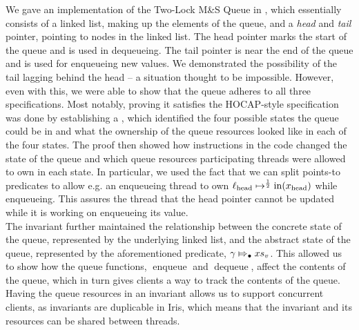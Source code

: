 \documentclass[a4paper, 10pt]{report}
\theoremstyle{definition}
\newcommand{\enqueue}{\operatorname{enqueue}}
\newcommand{\dequeue}{\operatorname{dequeue}}
\newcommand{\msq}{M\&S Queue}
\newcommand{\tlmsq}{Two-Lock \msq{}}
\newcommand{\locN}[1]{\loc_{\mathrm{#1}}}
\newcommand{\lochead}{\locN{head}}
\newcommand{\nIn}[1]{\operatorname{in}(#1)}
\newcommand{\node}{x}
\newcommand{\nodeN}[1]{\node_{\mathrm{#1}}}
\newcommand{\nodehead}{\nodeN{head}}
\newcommand{\absvalueList}{xs_v}
\newcommand{\abstractstateauth}[2]{#1 \Mapsto_{\bullet} #2}
\begin{document}
We gave an implementation of the \tlmsq{} in \heaplang{}, which essentially consists of a linked list, making up the elements of the queue, and a \textit{head} and \textit{tail} pointer, pointing to nodes in the linked list. The head pointer marks the start of the queue and is used in dequeueing. The tail pointer is near the end of the queue and is used for enqueueing new values. We demonstrated the possibility of the tail lagging behind the head -- a situation thought to be impossible. However, even with this, we were able to show that the queue adheres to all three specifications. Most notably, proving it satisfies the HOCAP-style specification was done by establishing a , which identified the four possible states the queue could be in and what the ownership of the queue resources looked like in each of the four states. The proof then showed how instructions in the code changed the state of the queue and which queue resources participating threads were allowed to own in each state. In particular, we used the fact that we can split points-to predicates to allow e.g. an enqueueing thread to own $\lochead \mapsto^{\frac{1}{2}} \nIn{\nodehead}$ while enqueueing. This assures the thread that the head pointer cannot be updated while it is working on enqueueing its value.\\
The invariant further maintained the relationship between the concrete state of the queue, represented by the underlying linked list, and the abstract state of the queue, represented by the aforementioned predicate, $\abstractstateauth{\gname}{\absvalueList}$. This allowed us to show how the queue functions, $\enqueue$ and $\dequeue$, affect the contents of the queue, which in turn gives clients a way to track the contents of the queue.\\
Having the queue resources in an invariant allows us to support concurrent clients, as invariants are duplicable in Iris, which means that the invariant and its resources can be shared between threads.
\end{document}
